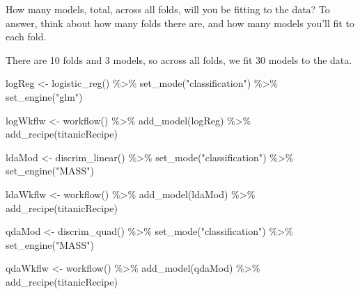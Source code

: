 \documentclass[
]{article}
\newenvironment{Shaded}{\begin{snugshade}}{\end{snugshade}}
\newcommand{\FunctionTok}[1]{\textcolor[rgb]{0.00,0.00,0.00}{#1}}
\newcommand{\NormalTok}[1]{#1}
\newcommand{\OtherTok}[1]{\textcolor[rgb]{0.56,0.35,0.01}{#1}}
\newcommand{\SpecialCharTok}[1]{\textcolor[rgb]{0.00,0.00,0.00}{#1}}
\newcommand{\StringTok}[1]{\textcolor[rgb]{0.31,0.60,0.02}{#1}}
\begin{document}
How many models, total, across all folds, will you be fitting to the
data? To answer, think about how many folds there are, and how many
models you'll fit to each fold.

There are 10 folds and 3 models, so across all folds, we fit 30 models
to the data.

\begin{Shaded}
\begin{Highlighting}[]
\NormalTok{logReg }\OtherTok{\textless{}{-}} \FunctionTok{logistic\_reg}\NormalTok{() }\SpecialCharTok{\%\textgreater{}\%}
  \FunctionTok{set\_mode}\NormalTok{(}\StringTok{"classification"}\NormalTok{) }\SpecialCharTok{\%\textgreater{}\%}
  \FunctionTok{set\_engine}\NormalTok{(}\StringTok{"glm"}\NormalTok{)}

\NormalTok{logWkflw }\OtherTok{\textless{}{-}} \FunctionTok{workflow}\NormalTok{() }\SpecialCharTok{\%\textgreater{}\%}
  \FunctionTok{add\_model}\NormalTok{(logReg) }\SpecialCharTok{\%\textgreater{}\%}
  \FunctionTok{add\_recipe}\NormalTok{(titanicRecipe)}



\NormalTok{ldaMod }\OtherTok{\textless{}{-}} \FunctionTok{discrim\_linear}\NormalTok{() }\SpecialCharTok{\%\textgreater{}\%}
  \FunctionTok{set\_mode}\NormalTok{(}\StringTok{"classification"}\NormalTok{) }\SpecialCharTok{\%\textgreater{}\%}
  \FunctionTok{set\_engine}\NormalTok{(}\StringTok{"MASS"}\NormalTok{)}

\NormalTok{ldaWkflw }\OtherTok{\textless{}{-}} \FunctionTok{workflow}\NormalTok{() }\SpecialCharTok{\%\textgreater{}\%}
  \FunctionTok{add\_model}\NormalTok{(ldaMod) }\SpecialCharTok{\%\textgreater{}\%}
  \FunctionTok{add\_recipe}\NormalTok{(titanicRecipe)}
  


\NormalTok{qdaMod }\OtherTok{\textless{}{-}} \FunctionTok{discrim\_quad}\NormalTok{() }\SpecialCharTok{\%\textgreater{}\%}
  \FunctionTok{set\_mode}\NormalTok{(}\StringTok{"classification"}\NormalTok{) }\SpecialCharTok{\%\textgreater{}\%}
  \FunctionTok{set\_engine}\NormalTok{(}\StringTok{"MASS"}\NormalTok{)}

\NormalTok{qdaWkflw }\OtherTok{\textless{}{-}} \FunctionTok{workflow}\NormalTok{() }\SpecialCharTok{\%\textgreater{}\%}
  \FunctionTok{add\_model}\NormalTok{(qdaMod) }\SpecialCharTok{\%\textgreater{}\%}
  \FunctionTok{add\_recipe}\NormalTok{(titanicRecipe)}
\end{Highlighting}
\end{Shaded}
\end{document}
